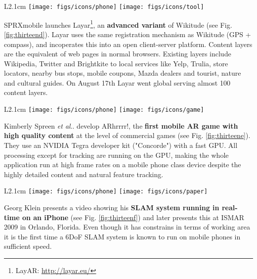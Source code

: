 \documentclass[12pt,a4paper]{article}
\makeatletter
\DeclareRobustCommand\onedot{\futurelet\@let@token\@onedot}
\def\@onedot{\ifx\@let@token.\else.\null\fi\xspace}
\def\etal{\emph{et al}\onedot}
\makeatother
\begin{document}
\vspace{0.1in}

\begin{wrapfigure}{L}{2.1cm}
	\vspace{-15pt}	
	\texttt{[image: figs/icons/phone]}
	\texttt{[image: figs/icons/tool]}	
	\vspace{-25pt}		
\end{wrapfigure}
\noindent SPRXmobile launches Layar\footnote{LayAR: \url{http://layar.eu/}}, an \textbf{advanced variant} of Wikitude (see Fig. \ref{fig:thirteend}). Layar uses the same registration mechanism as Wikitude (GPS + compass), and incoperates this into an open client-server platform. Content layers are the equivalent of web pages in normal browsers. Existing layers include Wikipedia, Twitter and Brightkite to local services like Yelp, Trulia, store locators, nearby bus stops, mobile coupons, Mazda dealers and tourist, nature and cultural guides. On August 17th Layar went global serving almost 100 content layers.

\vspace{0.1in}

\begin{wrapfigure}{L}{2.1cm}
	\vspace{-0pt}	
	\texttt{[image: figs/icons/phone]}
	\texttt{[image: figs/icons/game]}	
	\vspace{-30pt}		
\end{wrapfigure}
\noindent Kimberly Spreen \etal develop ARhrrrr!, the \textbf{first mobile AR game with high quality content} at the level of commercial games (see Fig. \ref{fig:thirteene}). They use an NVIDIA Tegra developer kit ("Concorde") with a fast GPU. All processing except for tracking are running on the GPU, making the whole application run at high frame rates on a mobile phone class device despite the highly detailed content and natural feature tracking.

\vspace{0.1in}

\begin{wrapfigure}{L}{2.1cm}
	\vspace{-15pt}	
	\texttt{[image: figs/icons/phone]}
	\texttt{[image: figs/icons/paper]}	
	\vspace{-25pt}		
\end{wrapfigure}
\noindent Georg Klein presents a video showing his \textbf{SLAM system running in real-time on an iPhone} \cite{Klein09} (see Fig. \ref{fig:thirteenf}) and later presents this at ISMAR 2009 in Orlando, Florida. Even though it has constrains in terms of working area it is the first time a 6DoF SLAM system is known to run on mobile phones in sufficient speed.
\end{document}
